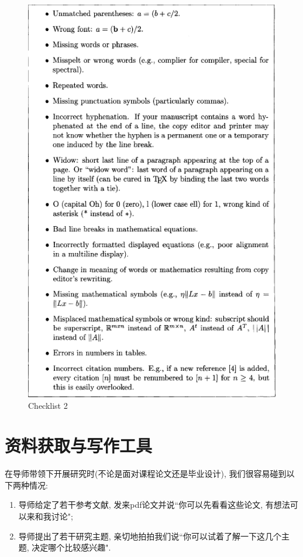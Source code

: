 \documentclass{formatBook}
\begin{document}
\begin{figure}[htb]
    \centering
    \includegraphics{figure/Figure 8.2.png}
    \caption{Checklist 2}
    \label{fig:my_label}
\end{figure}
\chapter{资料获取与写作工具}
在导师带领下开展研究时(不论是面对课程论文还是毕业设计), 我们很容易碰到以下两种情况:
\begin{enumerate}
    \item 导师给定了若干参考文献, 发来pdf论文并说``你可以先看看这些论文, 有想法可以来和我讨论";
    \item 导师提出了若干研究主题, 亲切地拍拍我们说``你可以试着了解一下这几个主题, 决定哪个比较感兴趣".
\end{enumerate}
\end{document}
